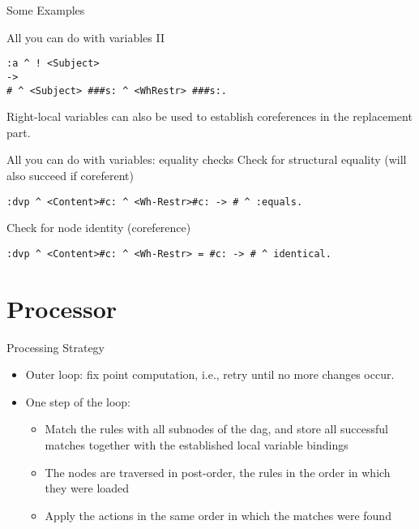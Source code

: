 \documentclass{beamer}
\begin{document}

\begin{frame}[fragile]{Some Examples}
\begin{block}{All you can do with variables II}\small
\vspace*{-2.5ex}%
\begin{verbatim}
:a ^ ! <Subject>
->
# ^ <Subject> ###s: ^ <WhRestr> ###s:.
\end{verbatim}
Right-local variables can also be used to establish coreferences in the
replacement part.
\end{block}

\begin{block}{All you can do with variables: equality checks}\small
Check for structural equality (will also succeed if coreferent)
\begin{verbatim}
:dvp ^ <Content>#c: ^ <Wh-Restr>#c: -> # ^ :equals.
\end{verbatim}
Check for node identity (coreference)
\begin{verbatim}
:dvp ^ <Content>#c: ^ <Wh-Restr> = #c: -> # ^ identical.
\end{verbatim}
\end{block}
\end{frame}


\section{Processor}


\begin{frame}{Processing Strategy}
  \begin{itemize}
  \item Outer loop: fix point computation, i.e., retry until no more changes
    occur.
  \item One step of the loop:
    \begin{itemize}
    \item Match the rules with all subnodes of the dag, and store all
      successful matches together with the established local variable bindings
    \item The nodes are traversed in post-order, the rules in the order in
      which they were loaded
    \item Apply the actions in the same order in which the matches were found
    \end{itemize}
  \end{itemize}
\end{frame}
\end{document}
